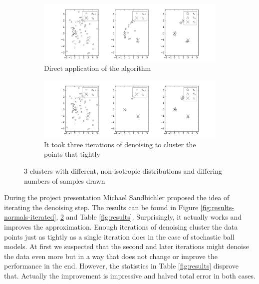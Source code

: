 \documentclass[10pt,a4paper]{article}
\begin{document}
\begin{figure}[h]
  \centering
  \begin{subfigure}{\textwidth}
    \centering
    \includegraphics[width=\textwidth]{figures/results-mixed}
    \caption{Direct application of the algorithm}
\label{fig:results-mixed}
  \end{subfigure}
  \begin{subfigure}{\textwidth}
    \centering
    \includegraphics[width=\textwidth]{figures/results-mixed-iterated}
    \caption{It took three iterations of denoising to cluster the points that tightly}
\label{fig:results-mixed-iterated}
  \end{subfigure}
  \caption{3 clusters with different, non-isotropic distributions and differing numbers of samples drawn}
  \label{fig:results-mixed-top}
\end{figure}

During the project presentation Michael Sandbichler proposed the idea of iterating the denoising step.
The results can be found in Figure \ref{fig:results-normals-iterated}, \ref{fig:results-mixed-iterated} and Table \ref{fig:results}.
Surprisingly, it actually works and improves the approximation.
Enough iterations of denoising cluster the data points just as tightly as a single iteration does in the case of stochastic ball models.
At first we suspected that the second and later iterations might denoise the data even more but in a way that does not change or improve the performance in the end.
However, the statistics in Table \ref{fig:results} disprove that.
Actually the improvement is impressive and halved total error in both cases.
\end{document}
